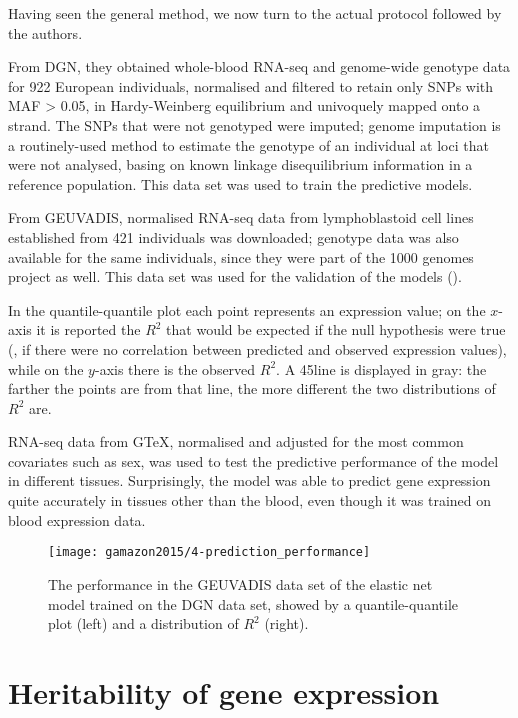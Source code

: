\documentclass[../main.tex]{subfiles}
\begin{document}
Having seen the general method, we now turn to the actual protocol 
followed by the authors.

From DGN, they obtained whole-blood RNA-seq and genome-wide genotype 
data for 922 European individuals, normalised and filtered to retain 
only SNPs with MAF > 0.05, in Hardy-Weinberg equilibrium and univoquely 
mapped onto a strand. The SNPs that were not genotyped were imputed; 
genome imputation\cite{Marchini2010} is a routinely-used method to 
estimate the genotype of an individual at loci that were not analysed, 
basing on known linkage disequilibrium information in a reference 
population. This data set was used to train the predictive models.

From GEUVADIS, normalised RNA-seq data from lymphoblastoid cell lines 
established from 421 individuals was downloaded; genotype data was also 
available for the same individuals, since they were part of the 1000 
genomes project as well. This data set was used for the validation of 
the models ().

In the quantile-quantile plot each point represents an expression value; 
on the $x$-axis it is reported the $R^2$ that would be expected if the 
null hypothesis were true (\ie, if there were no correlation between 
predicted and observed expression values), while on the $y$-axis there 
is the observed $R^2$. A 45\textdegree line is displayed in gray: the 
farther the points are from that line, the more different the two 
distributions of $R^2$ are.

RNA-seq data from GTeX, normalised and adjusted for the most common 
covariates such as sex, was used to test the predictive performance of 
the model in different tissues. Surprisingly, the model was able to 
predict gene expression quite accurately in tissues other than the 
blood, even though it was trained on blood expression data.

\begin{figure}
	\texttt{[image: gamazon2015/4-prediction\_performance]}
	\caption{The performance in the GEUVADIS data set of the elastic net 
model trained on the DGN data set, showed by a quantile-quantile plot 
(left) and a distribution of $R^2$ (right).}
\end{figure}

\section{Heritability of gene expression}
\end{document}
